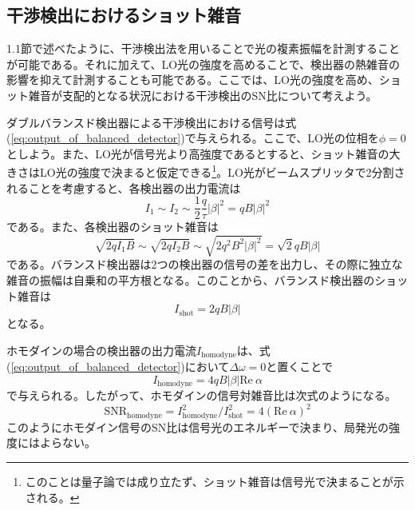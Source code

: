 \subsection{干渉検出におけるショット雑音}
1.1節で述べたように、干渉検出法を用いることで光の複素振幅を計測することが可能である。それに加えて、LO光の強度を高めることで、検出器の熱雑音の影響を抑えて計測することも可能である。ここでは、LO光の強度を高め、ショット雑音が支配的となる状況における干渉検出のSN比について考えよう。

ダブルバランスド検出器による干渉検出における信号は式(\ref{eq:output_of_balanced_detector})で与えられる。ここで、LO光の位相を$\phi = 0$としよう。また、LO光が信号光より高強度であるとすると、ショット雑音の大きさはLO光の強度で決まると仮定できる\footnote{このことは量子論では成り立たず、ショット雑音は信号光で決まることが示される。}。LO光がビームスプリッタで2分割されることを考慮すると、各検出器の出力電流は
\begin{equation}
  I_1 \sim I_2 \sim \frac 1 2 \frac q {\tau} |\beta|^2 = qB|\beta|^2
\end{equation}
である。また、各検出器のショット雑音は
\begin{equation}
  \sqrt{2qI_1B} \sim \sqrt{2qI_2B} \sim \sqrt{2q^2B^2|\beta|^2} =\sqrt 2 qB|\beta|
\end{equation}
である。バランスド検出器は2つの検出器の信号の差を出力し、その際に独立な雑音の振幅は自乗和の平方根となる。このことから、バランスド検出器のショット雑音は
\begin{equation}
  I_\mathrm{shot} = 2qB|\beta|
  \label{eq:shot_noise_of_balanced_detector}
\end{equation}
となる。

ホモダインの場合の検出器の出力電流$I_\mathrm{homodyne}$は、式(\ref{eq:output_of_balanced_detector})において$\Delta \omega = 0$と置くことで
\begin{equation}
  I_\mathrm{homodyne} = 4qB|\beta|\mathrm{Re} \ \alpha
\end{equation}
で与えられる。したがって、ホモダインの信号対雑音比は次式のようになる。
\begin{equation}
  \mathrm{SNR_{homodyne}} = I_\mathrm{homodyne}^2/I_\mathrm{shot}^2 = 4(\mathrm{Re} \ \alpha)^2
\end{equation}
このようにホモダイン信号のSN比は信号光のエネルギーで決まり、局発光の強度にはよらない。

